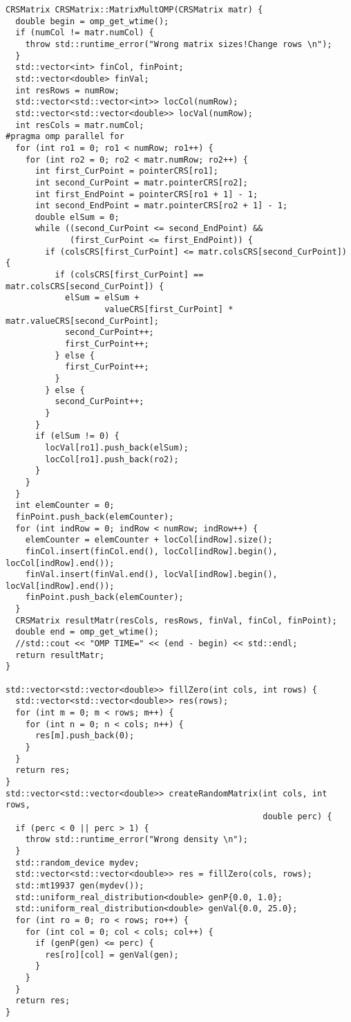 \documentclass[14pt, russian]{extarticle}
\begin{document}
\begin{lstlisting}
CRSMatrix CRSMatrix::MatrixMultOMP(CRSMatrix matr) {
  double begin = omp_get_wtime();
  if (numCol != matr.numCol) {
    throw std::runtime_error("Wrong matrix sizes!Change rows \n");
  }
  std::vector<int> finCol, finPoint;
  std::vector<double> finVal;
  int resRows = numRow;
  std::vector<std::vector<int>> locCol(numRow);
  std::vector<std::vector<double>> locVal(numRow);
  int resCols = matr.numCol;
#pragma omp parallel for
  for (int ro1 = 0; ro1 < numRow; ro1++) {
    for (int ro2 = 0; ro2 < matr.numRow; ro2++) {
      int first_CurPoint = pointerCRS[ro1];
      int second_CurPoint = matr.pointerCRS[ro2];
      int first_EndPoint = pointerCRS[ro1 + 1] - 1;
      int second_EndPoint = matr.pointerCRS[ro2 + 1] - 1;
      double elSum = 0;
      while ((second_CurPoint <= second_EndPoint) &&
             (first_CurPoint <= first_EndPoint)) {
        if (colsCRS[first_CurPoint] <= matr.colsCRS[second_CurPoint]) {
          if (colsCRS[first_CurPoint] == matr.colsCRS[second_CurPoint]) {
            elSum = elSum +
                    valueCRS[first_CurPoint] * matr.valueCRS[second_CurPoint];
            second_CurPoint++;
            first_CurPoint++;
          } else {
            first_CurPoint++;
          }
        } else {
          second_CurPoint++;
        }
      }
      if (elSum != 0) {
        locVal[ro1].push_back(elSum);
        locCol[ro1].push_back(ro2);
      }
    }
  }
  int elemCounter = 0;
  finPoint.push_back(elemCounter);
  for (int indRow = 0; indRow < numRow; indRow++) {
    elemCounter = elemCounter + locCol[indRow].size();
    finCol.insert(finCol.end(), locCol[indRow].begin(), locCol[indRow].end());
    finVal.insert(finVal.end(), locVal[indRow].begin(), locVal[indRow].end());
    finPoint.push_back(elemCounter);
  }
  CRSMatrix resultMatr(resCols, resRows, finVal, finCol, finPoint);
  double end = omp_get_wtime();  
  //std::cout << "OMP TIME=" << (end - begin) << std::endl;
  return resultMatr;
}

std::vector<std::vector<double>> fillZero(int cols, int rows) {
  std::vector<std::vector<double>> res(rows);
  for (int m = 0; m < rows; m++) {
    for (int n = 0; n < cols; n++) {
      res[m].push_back(0);
    }
  }
  return res;
}
std::vector<std::vector<double>> createRandomMatrix(int cols, int rows,
                                                    double perc) {
  if (perc < 0 || perc > 1) {
    throw std::runtime_error("Wrong density \n");
  }
  std::random_device mydev;
  std::vector<std::vector<double>> res = fillZero(cols, rows);
  std::mt19937 gen(mydev());
  std::uniform_real_distribution<double> genP{0.0, 1.0};
  std::uniform_real_distribution<double> genVal{0.0, 25.0};
  for (int ro = 0; ro < rows; ro++) {
    for (int col = 0; col < cols; col++) {
      if (genP(gen) <= perc) {
        res[ro][col] = genVal(gen);
      }
    }
  }
  return res;
}


\end{lstlisting}
\end{document}
